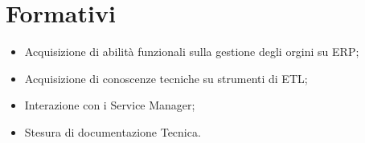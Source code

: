 \chapter{Formativi}
\begin{itemize}
\item Acquisizione di abilità funzionali sulla gestione degli orgini su ERP;
\item Acquisizione di conoscenze tecniche su strumenti di ETL;
\item Interazione con i Service Manager;
\item Stesura di documentazione Tecnica.
\end{itemize}